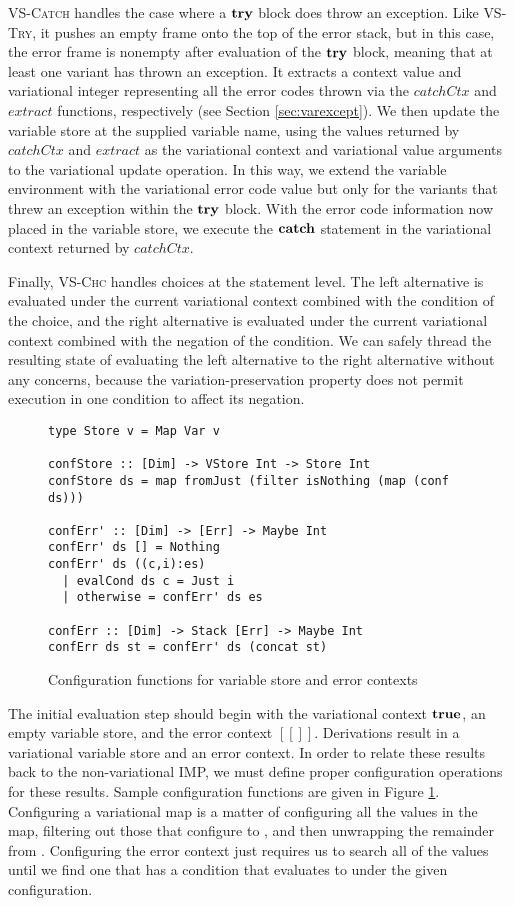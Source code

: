 \documentclass[12pt,oneside]{book}
\begin{document}
\textsc{VS-Catch} handles the case where a $\textbf{\textup{\textrm{try}}}$ block does throw an exception. Like \textsc{VS-Try}, it pushes an empty frame onto the top of the error
stack, but in this case, the error frame is nonempty after evaluation of the $\textbf{\textup{\textrm{try}}}$ block, meaning that at least one variant has thrown an exception.
It extracts a context value and variational integer representing all the error codes thrown via the $\mathit{catchCtx}$ and $\mathit{extract}$ functions, respectively (see
Section \ref{sec:varexcept}). We then update the variable store at the supplied variable name, using the values returned by $\mathit{catchCtx}$ and $\mathit{extract}$
as the variational context and variational value arguments to the variational update operation. In this way, we extend the variable environment with the variational
error code value but only for the variants that threw an exception within the $\textbf{\textup{\textrm{try}}}$ block. With the error code information now placed in the variable store,
we execute the $\textbf{\textup{\textrm{catch}}}$ statement in the variational context returned by $\mathit{catchCtx}$.

Finally, \textsc{VS-Chc} handles choices at the statement level. The left alternative is evaluated under the current variational context combined with the condition of
the choice, and the right alternative is evaluated under the current variational context combined with the negation of the condition.
We can safely thread the resulting state of evaluating the left alternative to the right alternative without any concerns, because the variation-preservation property
does not permit execution in one condition to affect its negation.

\begin{figure}
\begin{lstlisting}
type Store v = Map Var v

confStore :: [Dim] -> VStore Int -> Store Int
confStore ds = map fromJust (filter isNothing (map (conf ds)))

confErr' :: [Dim] -> [Err] -> Maybe Int
confErr' ds [] = Nothing
confErr' ds ((c,i):es)
  | evalCond ds c = Just i
  | otherwise = confErr' ds es

confErr :: [Dim] -> Stack [Err] -> Maybe Int
confErr ds st = confErr' ds (concat st)
\end{lstlisting}
\caption{Configuration functions for variable store and error contexts}
\label{fig:confstmt}
\end{figure}

The initial evaluation step should begin with the variational context $\textbf{\textup{\textrm{true}}}$, an empty variable store, and the error context $[[]]$. Derivations result
in a variational variable store and an error context. In order to relate these results back to the non-variational IMP, we must define proper configuration operations
for these results. Sample configuration functions are given in Figure \ref{fig:confstmt}. Configuring a variational map is a matter of configuring all the values in the map,
filtering out those that configure to , and then unwrapping the remainder from . Configuring the error context just requires us to search all of the
values until we find one that has a condition that evaluates to  under the given configuration.
\end{document}
